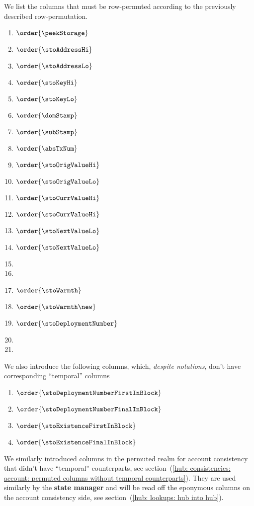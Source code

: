 We list the columns that must be row-permuted according to the previously described row-permutation.
\begin{multicols}{3}
	\begin{enumerate}
		\item $\order{\peekStorage}$
		\item $\order{\stoAddressHi}$
		\item $\order{\stoAddressLo}$
		\item $\order{\stoKeyHi}$
		\item $\order{\stoKeyLo}$
		\item $\order{\domStamp}$
		\item $\order{\subStamp}$
		\item $\order{\absTxNum}$
		\item $\order{\stoOrigValueHi}$
		\item $\order{\stoOrigValueLo}$
		\item $\order{\stoCurrValueHi}$
		\item $\order{\stoCurrValueHi}$
		\item $\order{\stoNextValueLo}$
		\item $\order{\stoNextValueLo}$
		\item[\vspace{\fill}]
		\item[\vspace{\fill}]
		\item $\order{\stoWarmth}$
		\item $\order{\stoWarmth\new}$
		\item $\order{\stoDeploymentNumber}$
		\item[\vspace{\fill}]
		\item[\vspace{\fill}]
	\end{enumerate}
\end{multicols}
We also introduce the following columns, which, \emph{despite notations}, don't have corresponding ``temporal'' columns
\begin{enumerate}
	\item $\order{\stoDeploymentNumberFirstInBlock}$
	\item $\order{\stoDeploymentNumberFinalInBlock}$
	\item $\order{\stoExistenceFirstInBlock}$
	\item $\order{\stoExistenceFinalInBlock}$
\end{enumerate}
\saNote{}
We similarly introduced columns in the permuted realm for account consistency that didn't have ``temporal'' counterparts,
see section~(\ref{hub: consistencies: account: permuted columns without temporal counterparts}).
They are used similarly by the \textbf{state manager} and will be read off the eponymous columns on the account consistency side,
see section~(\ref{hub: lookups: hub into hub}).

